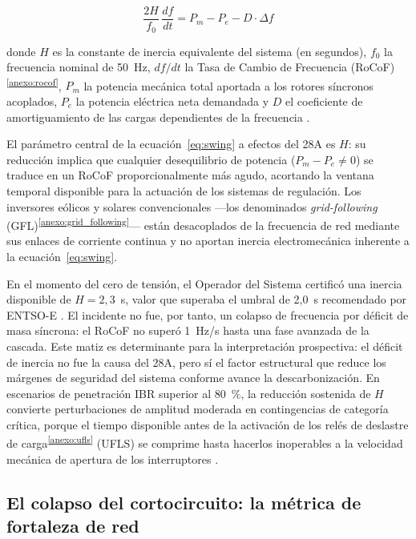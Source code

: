\begin{equation}
    \frac{2H}{f_0} \, \frac{df}{dt} = P_m - P_e - D \cdot \Delta f
    \label{eq:swing}
\end{equation}

donde $H$ es la constante de inercia equivalente del sistema (en
segundos), $f_0$ la frecuencia nominal de 50~Hz, $df/dt$ la Tasa de
Cambio de Frecuencia (RoCoF)\textsuperscript{\ref{anexo:rocof}}, $P_m$
la potencia mecánica total aportada a los rotores síncronos acoplados,
$P_e$ la potencia eléctrica neta demandada y $D$ el coeficiente de
amortiguamiento de las cargas dependientes de la frecuencia
\cite{nrel2025}.

El parámetro central de la ecuación~\eqref{eq:swing} a efectos del 28A
es $H$: su reducción implica que cualquier desequilibrio de potencia
($P_m - P_e \neq 0$) se traduce en un RoCoF proporcionalmente más agudo,
acortando la ventana temporal disponible para la actuación de los sistemas
de regulación. Los inversores eólicos y solares convencionales ---los
denominados \textit{grid-following}
(GFL)\textsuperscript{\ref{anexo:grid_following}}--- están desacoplados
de la frecuencia de red mediante sus enlaces de corriente continua y no
aportan inercia electromecánica inherente a la
ecuación~\eqref{eq:swing}.

En el momento del cero de tensión, el Operador del Sistema certificó una
inercia disponible de $H = 2{,}3$~s, valor que superaba el umbral de
2{,}0~s recomendado por ENTSO-E \cite{ree2025}. El incidente no fue,
por tanto, un colapso de frecuencia por déficit de masa síncrona: el
RoCoF no superó 1~Hz/s hasta una fase avanzada de la cascada. Este
matiz es determinante para la interpretación prospectiva: el déficit de
inercia no fue la causa del 28A, pero sí el factor estructural que reduce
los márgenes de seguridad del sistema conforme avance la
descarbonización. En escenarios de penetración IBR superior al 80~\%, la
reducción sostenida de $H$ convierte perturbaciones de amplitud moderada
en contingencias de categoría crítica, porque el tiempo disponible antes
de la activación de los relés de deslastre de
carga\textsuperscript{\ref{anexo:ufls}} (UFLS) se comprime hasta
hacerlos inoperables a la velocidad mecánica de apertura de los
interruptores \cite{mitceepr2025}.

\subsection{El colapso del cortocircuito: la métrica de fortaleza de red}
\label{subsec:scr_weakness}

